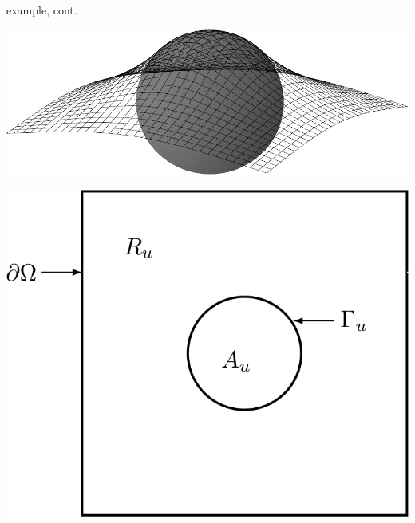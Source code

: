 \documentclass[svgnames,
               hyperref={colorlinks,citecolor=DeepPink4,linkcolor=FireBrick,urlcolor=Maroon},
               usepdftitle=false]  %
               {beamer}
\begin{document}
\begin{frame}{example, cont.}

\begin{minipage}[t]{0.55\textwidth}
\vspace{0pt}
\includegraphics[width=\textwidth]{../talk-oxford/images/obstacle65.pdf}
\end{minipage}
\hfill
\begin{minipage}[t]{0.3\textwidth}
\vspace{2mm}
\includegraphics[width=\textwidth]{../talk-oxford/images/obstacle-sets.png}
\end{minipage}


\end{frame}
\end{document}
